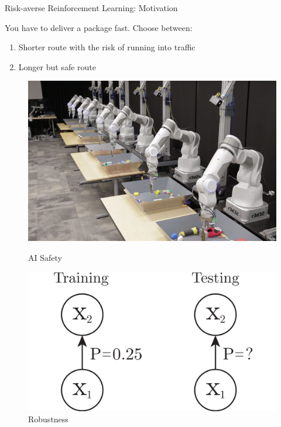 \documentclass{beamer}
\begin{document}
\begin{frame}{Risk-averse Reinforcement Learning: Motivation}
\begin{example}
You have to deliver a package fast. Choose between:
\begin{enumerate}
\item Shorter route with the risk of running into traffic
\item Longer but safe route
\end{enumerate}
\end{example}

\begin{figure}
    \centering
    \begin{minipage}{0.33\textwidth}
        \centering
        \includegraphics[width=0.88\linewidth]{gfx/Deep-Learning-for-Robots.jpg}
        \caption{ \footnotesize AI Safety}
    \end{minipage}\hfill
    \begin{minipage}{0.33\textwidth}
        \centering
        \includegraphics[width=\linewidth]{gfx/robustness.pdf}
        \caption{\footnotesize Robustness}
    \end{minipage}

\end{figure}
\end{frame}
\end{document}
